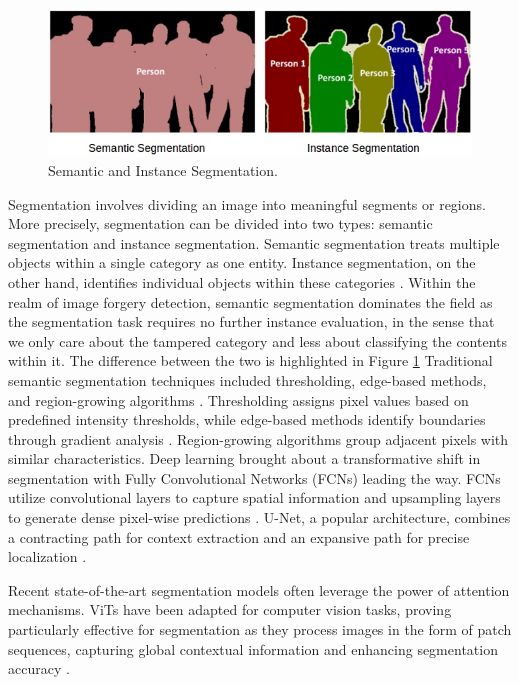\begin{figure}[h!]
  \centering
  \includegraphics[width=0.7\linewidth]{figures/semanticVSinstance.jpg} 
  \caption{Semantic and Instance Segmentation. \cite{Varatharasan}}
  \label{fig:semanticVSinstance}
\end{figure}


Segmentation involves dividing an image into meaningful segments or regions. More precisely, segmentation can be divided into two types: semantic segmentation and instance segmentation. Semantic segmentation treats multiple objects within a single category as one entity. Instance segmentation, on the other hand, identifies individual objects within these categories \cite{ruiz2020semantic}. Within the realm of image forgery detection, semantic segmentation dominates the field as the segmentation task requires no further instance evaluation, in the sense that we only care about the tampered category and less about classifying the contents within it. The difference between the two is highlighted in Figure \ref{fig:semanticVSinstance} Traditional semantic segmentation techniques included thresholding, edge-based methods, and region-growing algorithms \cite{zhai2023background}. Thresholding assigns pixel values based on predefined intensity thresholds, while edge-based methods identify boundaries through gradient analysis \cite{huang2018weakly}. Region-growing algorithms group adjacent pixels with similar characteristics. Deep learning brought about a transformative shift in segmentation with Fully Convolutional Networks (FCNs) leading the way. FCNs utilize convolutional layers to capture spatial information and upsampling layers to generate dense pixel-wise predictions \cite{long2015fully}. U-Net, a popular architecture, combines a contracting path for context extraction and an expansive path for precise localization \cite{ronneberger2015unet}.

Recent state-of-the-art segmentation models often leverage the power of attention mechanisms. ViTs have been adapted for computer vision tasks, proving particularly effective for segmentation as they process images in the form of patch sequences, capturing global contextual information and enhancing segmentation accuracy \cite{strudel2021segmenter} \cite{thisanke2023semantic}.

